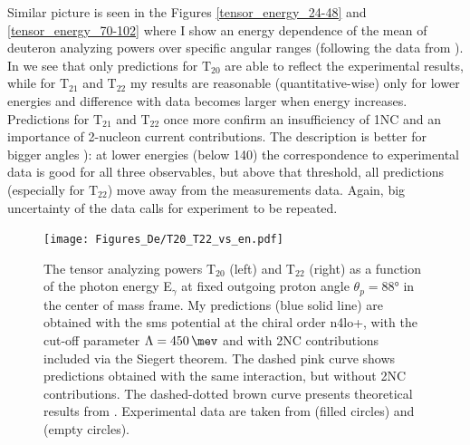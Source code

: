     Similar picture is seen in the Figures \ref{tensor_energy_24-48} and \ref{tensor_energy_70-102}
    where I show an energy dependence of the mean of deuteron analyzing powers over 
    specific angular ranges (following the data from \cite{rachek2007}).
    In  we see that only predictions for $\text{T}_{20}$
    are able to reflect the experimental results,
    while for $\text{T}_{21}$ and $\text{T}_{22}$ my results are reasonable (quantitative-wise) 
    only for lower energies and difference with data becomes larger
    when energy increases. Predictions for $\text{T}_{21}$ and $\text{T}_{22}$ once more 
    confirm an insufficiency of 1NC and an importance of
    2-nucleon current contributions.
    The description is better for bigger angles ):
    at lower energies (below \SI{140}{\mev}) the correspondence to
    experimental data is good for all three observables, but above that 
    threshold, all predictions (especially for $\text{T}_{22}$)
    move away from the measurements data.
    Again, big uncertainty of the data calls for experiment to be repeated.
    

    \begin{figure}[h]
        \begin{center}
        \texttt{[image: Figures\_De/T20\_T22\_vs\_en.pdf]}
        \end{center}
        \caption{
        The tensor analyzing powers T$_{20}$ (left) and T$_{22}$ (right) as
        a function of the photon energy E$_\gamma$
        at fixed outgoing proton angle $\theta_p = \ang{88}$ in the center of mass frame.
        My predictions (blue solid line) are obtained with the \gls{sms} potential at the chiral order \gls{n4lo+},
        with the cut-off parameter $\Lambda = \SI{450}{\mev}$ and with 2NC contributions included via the Siegert theorem.
        The dashed pink curve shows predictions obtained with the same interaction, but without 2NC contributions.
        The dashed-dotted brown curve presents theoretical results from \cite{Schmitt1989}.
        Experimental data are taken from \cite{rachek2007} (filled circles)
        and \cite{mishev1993} (empty circles).}
        \label{T20_vs_en}
    \end{figure}

